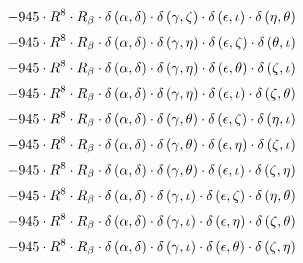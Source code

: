 \begin{subequations}
\begin{gather}
 \\[0.2em] \notag 		 - 945 \cdot R^{8} \cdot R_{\beta{}} \cdot \delta{}\left(\alpha{}, \delta{}\right) \cdot \delta{}\left(\gamma{}, \zeta{}\right) \cdot \delta{}\left(\epsilon{}, \iota{}\right) \cdot \delta{}\left(\eta{}, \theta{}\right) 
 \\[0.2em] \notag 		 - 945 \cdot R^{8} \cdot R_{\beta{}} \cdot \delta{}\left(\alpha{}, \delta{}\right) \cdot \delta{}\left(\gamma{}, \eta{}\right) \cdot \delta{}\left(\epsilon{}, \zeta{}\right) \cdot \delta{}\left(\theta{}, \iota{}\right) 
 \\[0.2em] \notag 		 - 945 \cdot R^{8} \cdot R_{\beta{}} \cdot \delta{}\left(\alpha{}, \delta{}\right) \cdot \delta{}\left(\gamma{}, \eta{}\right) \cdot \delta{}\left(\epsilon{}, \theta{}\right) \cdot \delta{}\left(\zeta{}, \iota{}\right) 
 \\[0.2em] \notag 		 - 945 \cdot R^{8} \cdot R_{\beta{}} \cdot \delta{}\left(\alpha{}, \delta{}\right) \cdot \delta{}\left(\gamma{}, \eta{}\right) \cdot \delta{}\left(\epsilon{}, \iota{}\right) \cdot \delta{}\left(\zeta{}, \theta{}\right) 
 \\[0.2em] \notag 		 - 945 \cdot R^{8} \cdot R_{\beta{}} \cdot \delta{}\left(\alpha{}, \delta{}\right) \cdot \delta{}\left(\gamma{}, \theta{}\right) \cdot \delta{}\left(\epsilon{}, \zeta{}\right) \cdot \delta{}\left(\eta{}, \iota{}\right) 
 \\[0.2em] \notag 		 - 945 \cdot R^{8} \cdot R_{\beta{}} \cdot \delta{}\left(\alpha{}, \delta{}\right) \cdot \delta{}\left(\gamma{}, \theta{}\right) \cdot \delta{}\left(\epsilon{}, \eta{}\right) \cdot \delta{}\left(\zeta{}, \iota{}\right) 
 \\[0.2em] \notag 		 - 945 \cdot R^{8} \cdot R_{\beta{}} \cdot \delta{}\left(\alpha{}, \delta{}\right) \cdot \delta{}\left(\gamma{}, \theta{}\right) \cdot \delta{}\left(\epsilon{}, \iota{}\right) \cdot \delta{}\left(\zeta{}, \eta{}\right) 
 \\[0.2em] \notag 		 - 945 \cdot R^{8} \cdot R_{\beta{}} \cdot \delta{}\left(\alpha{}, \delta{}\right) \cdot \delta{}\left(\gamma{}, \iota{}\right) \cdot \delta{}\left(\epsilon{}, \zeta{}\right) \cdot \delta{}\left(\eta{}, \theta{}\right) 
 \\[0.2em] \notag 		 - 945 \cdot R^{8} \cdot R_{\beta{}} \cdot \delta{}\left(\alpha{}, \delta{}\right) \cdot \delta{}\left(\gamma{}, \iota{}\right) \cdot \delta{}\left(\epsilon{}, \eta{}\right) \cdot \delta{}\left(\zeta{}, \theta{}\right) 
 \\[0.2em] \notag 		 - 945 \cdot R^{8} \cdot R_{\beta{}} \cdot \delta{}\left(\alpha{}, \delta{}\right) \cdot \delta{}\left(\gamma{}, \iota{}\right) \cdot \delta{}\left(\epsilon{}, \theta{}\right) \cdot \delta{}\left(\zeta{}, \eta{}\right) 

\end{gather}
\end{subequations}
